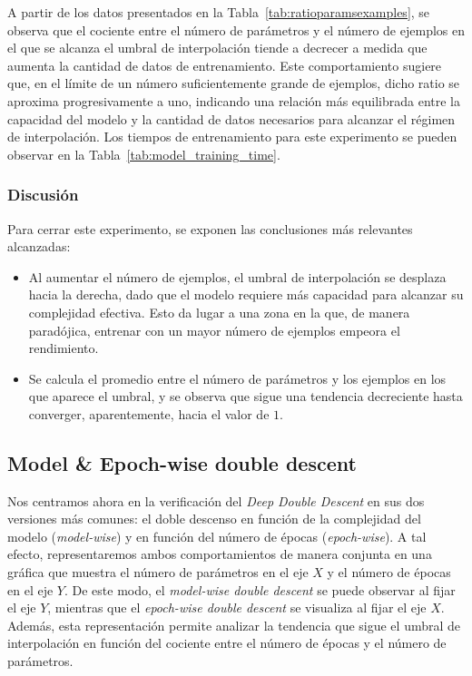 A partir de los datos presentados en la Tabla~\ref{tab:ratioparamsexamples}, se observa que el cociente entre el número de parámetros y el número de ejemplos en el que se alcanza el umbral de interpolación tiende a decrecer a medida que aumenta la cantidad de datos de entrenamiento. Este comportamiento sugiere que, en el límite de un número suficientemente grande de ejemplos, dicho ratio se aproxima progresivamente a uno, indicando una relación más equilibrada entre la capacidad del modelo y la cantidad de datos necesarios para alcanzar el régimen de interpolación. Los tiempos de entrenamiento para este experimento se pueden observar en la Tabla~\ref{tab:model_training_time}.\newline

\subsubsection{Discusión}\label{subsubsec:discusion-numero-ejemplos}

Para cerrar este experimento, se exponen las conclusiones más relevantes alcanzadas:

\begin{itemize}
    \item Al aumentar el número de ejemplos, el umbral de interpolación se desplaza hacia la derecha, dado que el modelo requiere más capacidad para alcanzar su complejidad efectiva. Esto da lugar a una zona en la que, de manera paradójica, entrenar con un mayor número de ejemplos empeora el rendimiento.
    \item Se calcula el promedio entre el número de parámetros y los ejemplos en los que aparece el umbral, y se observa que sigue una tendencia decreciente hasta converger, aparentemente, hacia el valor de $1$.
\end{itemize}

\subsection{Model \& Epoch-wise double descent}\label{subsec:model-epoch-wise}

Nos centramos ahora en la verificación del \textit{Deep Double Descent} en sus dos versiones más comunes: el doble descenso en función de la complejidad del modelo (\textit{model-wise}) y en función del número de épocas (\textit{epoch-wise}). A tal efecto, representaremos ambos comportamientos de manera conjunta en una gráfica que muestra el número de parámetros en el eje $X$ y el número de épocas en el eje $Y$. De este modo, el \textit{model-wise double descent} se puede observar al fijar el eje $Y$, mientras que el \textit{epoch-wise double descent} se visualiza al fijar el eje $X$. Además, esta representación permite analizar la tendencia que sigue el umbral de interpolación en función del cociente entre el número de épocas y el número de parámetros.\newline

